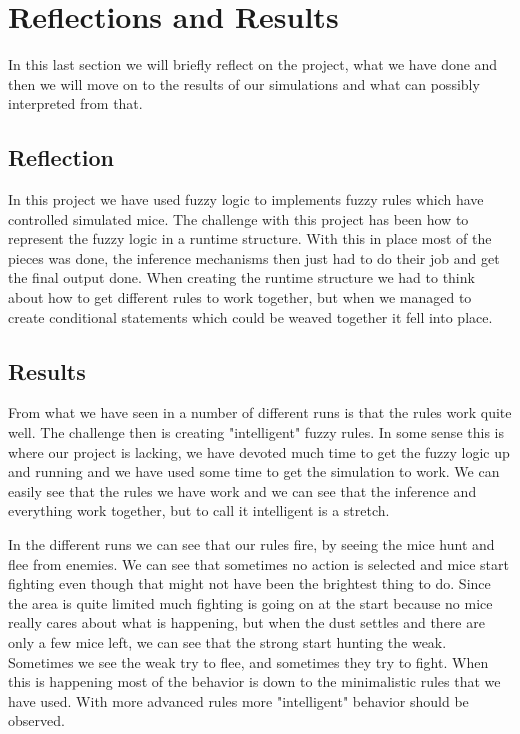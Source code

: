 \section{Reflections and Results}\label{reflections and results}
In this last section we will briefly reflect on the project, what we have
done and then we will move on to the results of our simulations and what can
possibly interpreted from that.

\subsection{Reflection}\label{reflection}
In this project we have used fuzzy logic to implements fuzzy rules which have
controlled simulated mice. The challenge with this project has been how to
represent the fuzzy logic in a runtime structure. With this in place most of
the pieces was done, the inference mechanisms then just had to do their job
and get the final output done. When creating the runtime structure we had to
think about how to get different rules to work together, but when we managed
to create conditional statements which could be weaved together it fell into
place.

\subsection{Results}\label{results}
From what we have seen in a number of different runs is that the rules work
quite well. The challenge then is creating "intelligent" fuzzy rules. In some
sense this is where our project is lacking, we have devoted much time to
get the fuzzy logic up and running and we have used some time to get the
simulation to work. We can easily see that the rules we have work and we
can see that the inference and everything work together, but to call
it intelligent is a stretch.

In the different runs we can see that our rules fire, by seeing the mice
hunt and flee from enemies. We can see that sometimes no action is selected
and mice start fighting even though that might not have been the brightest thing
to do. Since the area is quite limited much fighting is going on at the start
because no mice really cares about what is happening, but when the dust settles
and there are only a few mice left, we can see that the strong start hunting
the weak. Sometimes we see the weak try to flee, and sometimes they try to
fight. When this is happening most of the behavior is down to the minimalistic
rules that we have used. With more advanced rules more "intelligent" behavior
should be observed.

